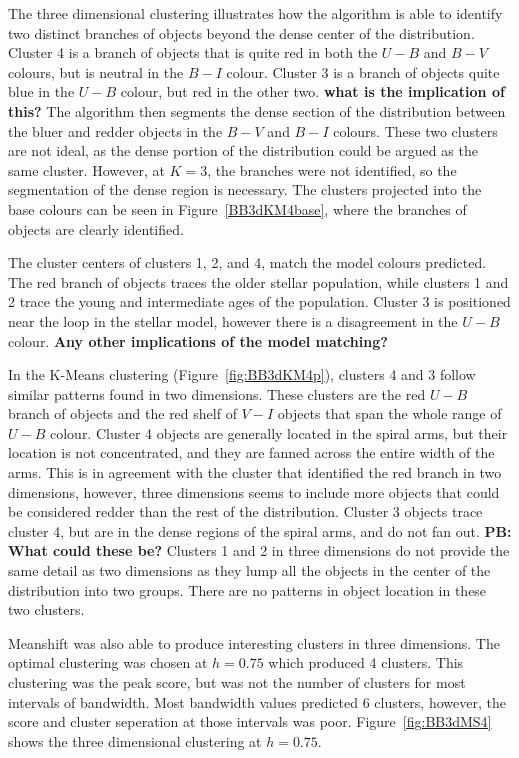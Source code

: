 The three dimensional clustering illustrates how the algorithm is able to identify two distinct branches of objects beyond the dense center of the distribution.
Cluster 4 is a branch of objects that is quite red in both the $U - B$ and $B - V$ colours, but is neutral in the $B - I$ colour.
Cluster 3 is a branch of objects quite blue in the $U - B$ colour, but red in the other two. \textbf{what is the implication of this?}
The algorithm then segments the dense section of the distribution between the bluer and redder objects in the $B - V$ and $B - I$ colours.
These two clusters are not ideal, as the dense portion of the distribution could be argued as the same cluster. 
However, at $K = 3$, the branches were not identified, so the segmentation of the dense region is necessary.
The clusters projected into the base colours can be seen in Figure~\ref{BB3dKM4base}, where the branches of objects are clearly identified.

The cluster centers of clusters 1, 2, and 4, match the model colours predicted.
The red branch of objects traces the older stellar population, while clusters 1 and 2 trace the young and intermediate ages of the population.
Cluster 3 is positioned near the loop in the stellar model, however there is a disagreement in the $U - B$ colour.
\textbf{Any other implications of the model matching?}

In the K-Means clustering (Figure~\ref{fig:BB3dKM4p}), clusters 4 and 3 follow similar patterns found in two dimensions.
These clusters are the red $U - B$ branch of objects and the red shelf of $V - I$ objects that span the whole range of $U - B$ colour.
Cluster 4 objects are generally located in the spiral arms, but their location is not concentrated, and they are fanned across the entire width of the arms.
This is in agreement with the cluster that identified the red branch in two dimensions, however, three dimensions seems to include more objects that could be considered redder than the rest of the distribution.
Cluster 3 objects trace cluster 4, but are in the dense regions of the spiral arms, and do not fan out. \textbf{PB: What could these be?}
Clusters 1 and 2 in three dimensions do not provide the same detail as two dimensions as they lump all the objects in the center of the distribution into two groups.
There are no patterns in object location in these two clusters.

Meanshift was also able to produce interesting clusters in three dimensions. 
The optimal clustering was chosen at $h=0.75$ which produced 4 clusters.
This clustering was the peak score, but was not the number of clusters for most intervals of bandwidth.
Most bandwidth values predicted 6 clusters, however, the score and cluster seperation at those intervals was poor.
Figure~\ref{fig:BB3dMS4} shows the three dimensional clustering at $h=0.75$.

